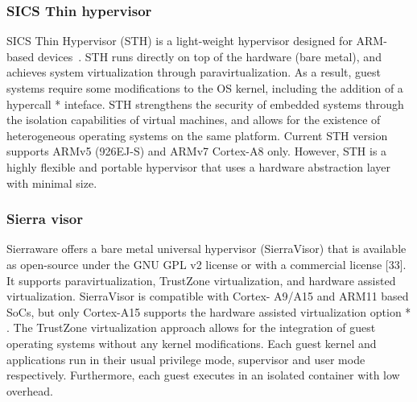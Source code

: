 \subsubsection{SICS Thin hypervisor}
SICS Thin Hypervisor (STH) is a light-weight hypervisor designed for ARM-
based devices~\cite{STH2013}. STH runs directly on top of the hardware (bare metal),
and achieves system virtualization through paravirtualization. As a result,
guest systems require some modifications to the OS kernel, including the
addition of a hypercall * inteface. STH strengthens the security of embedded
systems through the isolation capabilities of virtual machines, and allows
for the existence of heterogeneous operating systems on the same platform.
Current STH version supports ARMv5 (926EJ-S) and ARMv7 Cortex-A8
only. However, STH is a highly flexible and portable hypervisor that uses a
hardware abstraction layer with minimal size.

\subsubsection{Sierra visor}
Sierraware offers a bare metal universal hypervisor (SierraVisor) that is
available as open-source under the GNU GPL v2 license or with a commercial
license [33]. It supports paravirtualization, TrustZone virtualization, and
hardware assisted virtualization. SierraVisor is compatible with Cortex-
A9/A15 and ARM11 based SoCs, but only Cortex-A15 supports the
hardware assisted virtualization option * . The TrustZone virtualization
approach allows for the integration of guest operating systems without any
kernel modifications. Each guest kernel and applications run in their usual
privilege mode, supervisor and user mode respectively. Furthermore, each
guest executes in an isolated container with low overhead.

